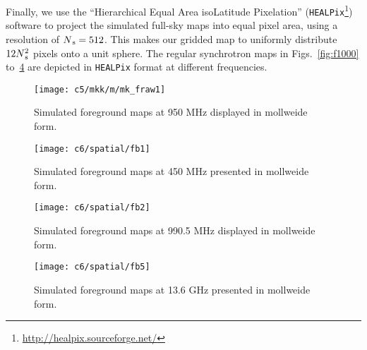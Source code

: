 Finally, we use the \enquote{Hierarchical Equal Area isoLatitude Pixelation} (\texttt{HEALPix}\footnote{\url{http://healpix.sourceforge.net/}}) 
software \citep{calabretta2007mapping,2005ApJ...622..759G} to project the simulated full-sky maps
into equal pixel area, using a resolution of $N_{\rm \, \rm s} = 512$. This makes our gridded map to uniformly distribute $12N_{\rm \, \rm s}^2$ pixels onto a unit sphere. 
The regular synchrotron maps in Figs.~\ref{fig:f1000} to~\ref{fig:f1306} are depicted in  \texttt{HEALPix} format at different frequencies. 


%  
\begin{figure}[ht]
	    \centering
	    \texttt{[image: c5/mkk/m/mk\_fraw1]} 
	    \caption{Simulated foreground maps at 950 MHz displayed in mollweide form.}
	    \label{fig:f950}
       \end{figure}
\FloatBarrier
%    
   \begin{figure}[ht]
	    \centering
	    \texttt{[image: c6/spatial/fb1]}  
	    \caption{Simulated foreground maps at 450 MHz presented in mollweide form.}
	    \label{fig:f450}
       \end{figure}
\FloatBarrier 
   \begin{figure}[ht]
	    \centering
	    \texttt{[image: c6/spatial/fb2]}   
	    \caption{Simulated foreground maps at 990.5 MHz displayed in mollweide form.}
	    \label{fig:f990}
       \end{figure}
\FloatBarrier   
  \begin{figure}[ht]
	    \centering
	    \texttt{[image: c6/spatial/fb5]}   
	    \caption{Simulated foreground maps at 13.6 GHz presented in mollweide form.}
	    \label{fig:f1306}
       \end{figure}
\FloatBarrier    
